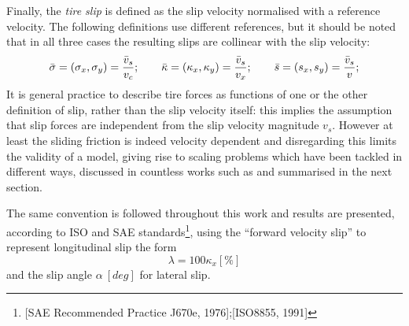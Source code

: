 \documentclass[12pt,a4paper]{report}
\newcommand{\virgolette}[1]{
\textquotedblleft #1\textquotedblright
}
\begin{document}
Finally, the \emph{tire slip} is defined as the slip velocity normalised with a reference velocity. The following definitions use different references, but it should be noted that in all three cases the resulting slips are collinear with the slip velocity:
\begin{equation}\label{eqn:slips}
\bar{\sigma} = (\sigma_x , \sigma_y) = {\bar{v}_s \over v_c}; \qquad \bar{\kappa} = (\kappa_x , \kappa_y) = {\bar{v}_s \over v_x};
\qquad \bar{s} = (s_x , s_y) = {\bar{v}_s \over v};
\end{equation}
It is general practice to describe tire forces as functions of one or the other definition of slip, rather than the slip velocity itself: this implies the assumption that slip forces are independent from the slip velocity magnitude $v_s$. However at least the sliding friction is indeed velocity dependent and disregarding this limits the validity of a model, giving rise to scaling problems which have been tackled in different ways, discussed in countless works such as \citep{sven09} and summarised in the next section.

The same convention is followed throughout this work and results are presented, according to ISO and SAE standards\nocite{iso91,sae}\footnote{[SAE Recommended Practice J670e, 1976];[ISO8855, 1991]}, using the \virgolette{forward velocity slip} to represent longitudinal slip the form
\begin{equation}\label{eqn:lambda}
\lambda = 100\kappa_x [ \% ]
\end{equation} and the slip angle $\alpha \: [deg]$ for lateral slip.
\end{document}
